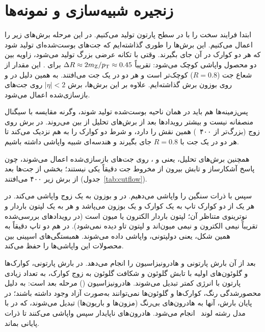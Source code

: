 \section{زنجیره شبیه‌سازی و نمونه‌ها}
\label{sec:sim}
ابتدا فرایند سخت را با  در سطح پارتون تولید می‌کنیم. در این مرحله برش‌های زیر را اعمال می‌کنیم. این برش‌ها را طوری گذاشته‌ایم که جت‌های بوست‌شده‌ای تولید شود که هر دو کوارک \bq{} در آن جای بگیرند. وقتی \Zbos{} با تکانه عرضی بزرگ تولید می‌شود، زاویه بین دو محصول واپاشی کوچک می‌شود: تقریباً $\Delta R\approx 2m_\mathrm{Z}/p_\mathrm{T}\approx 0.45$ برای . این مقدار از شعاع جت ($R=0.8$) کوچک‌تر است و هر دو \bq{} در یک جت می‌افتند. به همین دلیل در  و \ttZ روی \pt بوزون \Zbos{} برش  گذاشته‌ایم. علاوه بر این برش‌ها، برش $|\eta|<2$ روی جت‌های بازسازی‌شده اعمال می‌شود.

پس‌زمینه‌ها هم باید در همان ناحیه بوست‌شده تولید شوند، وگرنه مقایسه با سیگنال منصفانه نیست و بیشتر رویدادها بعد از برش‌های تحلیل از بین می‌روند. در \ttbb برش روی \pt زوج \bb (بزرگ‌تر از ۴۰۰~) همین نقش را دارد، و شرط  دو کوارک \bq{} را به هم نزدیک می‌کند تا هر دو در یک جت با $R=0.8$ جای بگیرند و هندسه‌ای شبیه واپاشی \Zbos{} داشته باشیم.

همچنین برش‌های تحلیل، یعنی  و ، روی جت‌های بازسازی‌شده اعمال می‌شوند، چون پاسخ آشکارساز و تابش بیرون از مخروط جت دقیقاً یکی نیستند؛ بخشی از جت‌ها بعد از برش \pt زیر ۴۰۰ می‌افتند (جدول~\ref{tab:cutflow}).

سپس با  ذرات سنگین را واپاشی می‌دهیم. در  و \ttZ بوزون \Zbos{} به یک زوج \bb واپاشی می‌کند. در \ttZ هر یک از دو کوارک تاپ به یک کوارک \bq{} و یک بوزون  می‌پاشد و هر  به یک لپتون باردار و نوترینوی متناظر آن؛ لپتون باردار الکترون یا میون است (در رویدادهای بررسی‌شده تقریباً نیمی الکترون و نیمی میون‌اند و لپتون تاو دیده نمی‌شود). در \ttbb هم دو تاپ دقیقاً به همین شکل، یعنی دولپتونی، واپاشی داده می‌شوند.  همبستگی‌های اسپینی بین محصولات این واپاشی‌ها را حفظ می‌کند.

بعد از آن  بارش پارتونی و هادرونیزاسیون را انجام می‌دهد. در بارش پارتونی، کوارک‌ها و گلوئون‌های اولیه با تابش گلوئون و شکافت گلوئون به زوج کوارک، به تعداد زیادی پارتون با انرژی کمتر تبدیل می‌شوند. هادرونیزاسیون () مرحله بعد است: به دلیل محصورشدگی رنگ، کوارک‌ها و گلوئون‌ها نمی‌توانند به‌صورت آزاد وجود داشته باشند؛ در پایان بارش، آنها به هادرون‌های بی‌رنگ (مزون‌ها و باریون‌ها) تبدیل می‌شوند، که در  با مدل رشته لوند~\cite{Andersson:1983ia} انجام می‌شود. هادرون‌های ناپایدار سپس واپاشی می‌کنند تا ذرات پایانی بماند.

